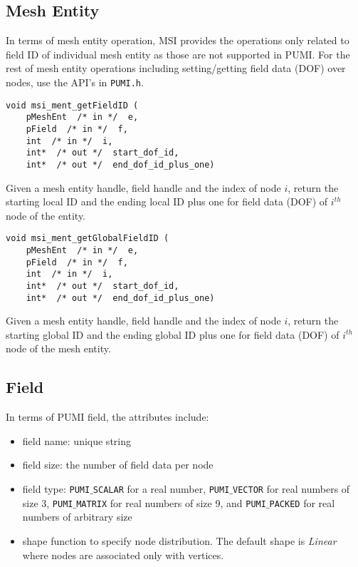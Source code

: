 \subsection{Mesh Entity}
In terms of mesh entity operation, MSI provides the operations only related to field ID of individual mesh entity as those are not supported in PUMI. For the rest of mesh entity operations including setting/getting field data (DOF) over nodes, use the API's in \texttt{PUMI.h}. 


\begin{verbatim}
void msi_ment_getFieldID (
    pMeshEnt  /* in */  e, 
    pField  /* in */  f, 
    int  /* in */  i,
    int*  /* out */  start_dof_id, 
    int*  /* out */  end_dof_id_plus_one)
\end{verbatim}\vspace{-.5cm}\hspace{1cm}
Given a mesh entity handle, field handle and the index of node $i$, return the starting local ID and the ending local ID plus one for field data (DOF) of $i^{th}$ node of the entity. 

\begin{verbatim}
void msi_ment_getGlobalFieldID (
    pMeshEnt  /* in */  e, 
    pField  /* in */  f, 
    int  /* in */  i,
    int*  /* out */  start_dof_id, 
    int*  /* out */  end_dof_id_plus_one)
\end{verbatim}\vspace{-.5cm}\hspace{1cm}
Given a mesh entity handle, field handle and the index of node $i$, return the starting global ID and the ending global ID plus one for field data (DOF) of $i^{th}$ node of the mesh entity. 

\subsection{Field}

In terms of PUMI field, the attributes include:
\begin{itemize}
\item field name: unique string 
\item field size: the number of field data per node
\item field type: \texttt{PUMI$\_$SCALAR} for a real number, \texttt{PUMI$\_$VECTOR} for real numbers of size 3, \texttt{PUMI$\_$MATRIX} for real numbers of size 9, and \texttt{PUMI$\_$PACKED} for real numbers of arbitrary size
\item shape function to specify node distribution. The default shape is \textit{Linear} where nodes are associated only with vertices.
\end{itemize}

